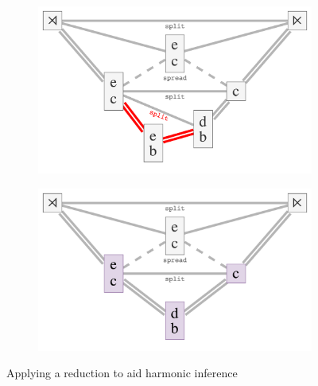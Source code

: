 \documentclass[12pt,a4paper,twoside,openright]{report}
\theoremstyle{definition}
\begin{document}
\begin{figure}[h]
  \begin{subfigure}[t]{.496\textwidth}
    \centering\includegraphics[keepaspectratio,width=\textwidth]{prep/harm/unreducedOuter.png}
    \caption{}
    \label{fig:pvHarmonyUnreducedOuter}
  \end{subfigure}
  \begin{subfigure}[t]{.496\textwidth}
    \centering\includegraphics[keepaspectratio,width=\textwidth]{prep/harm/reducedOuter.png}
    \caption{}
    \label{fig:pvHarmonyReducedOuter}
  \end{subfigure}

  \captionsetup{width=.9\linewidth}
  \caption{Applying a reduction to aid harmonic inference}
  \label{fig:pvHarmony}
\end{figure}


%
%
%
%
%
%
\end{document}
